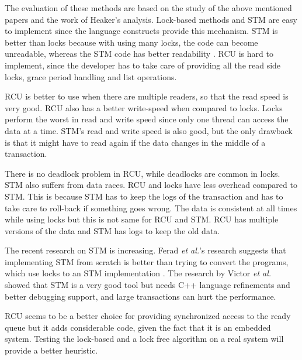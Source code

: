The evaluation of these methods are based on the study of the above mentioned papers and the work of Heaker's analysis. Lock-based methods and STM are easy to implement since the language constructs provide this mechanism. STM is better than locks because with using many locks, the code can become unreadable, whereas the STM code has better readability \cite{pankratius2014software}. RCU is hard to implement, since the developer has to take care of providing all the read side locks, grace period handling and list operations.

RCU is better to use when there are multiple readers, so that the read speed is very good. RCU also has a better write-speed when compared to locks. Locks perform the worst in read and write speed since only one thread can access the data at a time. STM's read and write speed is also good, but the only drawback is that it might have to read again if the data changes in the middle of a transaction.

There is no deadlock problem in RCU, while deadlocks are common in locks. STM also suffers from data races. RCU and locks have less overhead compared to STM. This is because STM has to keep the logs of the transaction and has to take care to roll-back if something goes wrong. The data is consistent at all times while using locks but this is not same for RCU and STM. RCU has multiple versions of the data and STM has logs to keep the old data.

The recent research on STM is increasing. Ferad \emph{et al.}'s research suggests that implementing STM from scratch is better than trying to convert the programs, which use locks to an STM implementation \cite{zyulkyarov2009atomic}. The research by Victor \emph{et al.} \cite{pankratius2014software} showed that STM is a very good tool but needs C++ language refinements and better debugging support, and large transactions can hurt the performance.

RCU seems to be a better choice for providing synchronized access to the ready queue but it adds considerable code, given the fact that it is an embedded system. Testing the lock-based and a lock free algorithm on a real system will provide a better heuristic. 

